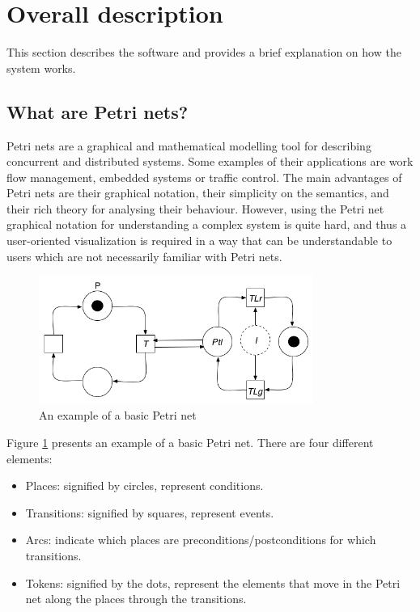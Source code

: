 \section{Overall description}
\label{sec:overall}
This section describes the software and provides a brief explanation on how the system works.

\subsection{What are Petri nets?}

Petri nets are a graphical and mathematical modelling tool for describing concurrent and distributed systems. Some examples of their applications are work flow management, embedded systems or traffic control. The main advantages of Petri nets are their graphical notation, their simplicity on the semantics, and their rich theory for analysing their behaviour. However, using the Petri net graphical notation for understanding a complex system is quite hard, and thus a user-oriented visualization is required in a way that can be understandable to users which are not necessarily familiar with Petri nets.


\begin{figure}[htp]
\begin{center}
  \includegraphics[width=0.8\textwidth]{image/petrinet_diagram.png}
  \caption{An example of a basic Petri net}
  \label{fig:petrinet}
\end{center}
\end{figure}

Figure \ref{fig:petrinet} presents an example of a basic Petri net. There are four different elements:

\begin{itemize}
\item Places: signified by circles, represent conditions.
\item Transitions: signified by squares, represent events.
\item Arcs: indicate which places are preconditions/postconditions for which transitions.
\item Tokens: signified by the dots, represent the elements that move in the Petri net along the places through the transitions.
\end{itemize}


